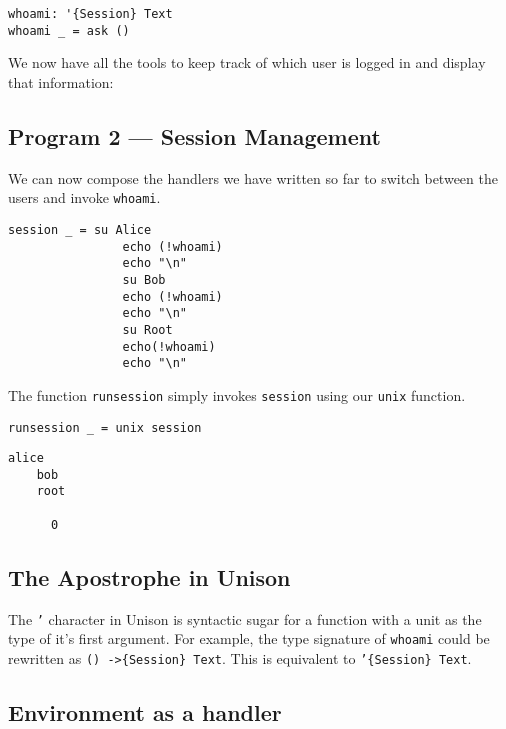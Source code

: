 \documentclass[logo,bsc,singlespacing,parskip]{infthesis}
\begin{document}
\begin{lstlisting}[language=unison]
whoami: '{Session} Text
whoami _ = ask ()
\end{lstlisting}

We now have all the tools to keep track of which user is logged in and display
that information:

\begin{tcolorbox}[colback=gray!10, colframe=black, arc=0pt, outer arc=0pt]
  \section*{Program 2 --- Session Management}
  
  We can now compose the handlers we have written so far to switch between the
  users and invoke \texttt{whoami}.

  \begin{lstlisting}[language=unison]
    session _ = su Alice
                echo (!whoami)
                echo "\n"
                su Bob
                echo (!whoami)
                echo "\n"
                su Root
                echo(!whoami)
                echo "\n"
  \end{lstlisting}

  The function \texttt{runsession} simply invokes \texttt{session} using our
  \texttt{unix} function.

  \begin{lstlisting}[language=unison]
    runsession _ = unix session
  \end{lstlisting}

  \begin{lstlisting}[style=terminal]
    alice
    bob
    root
      
      0
\end{lstlisting}
\end{tcolorbox}

\subsection{The Apostrophe in Unison}

The \texttt{'} character in Unison is syntactic sugar for a function with a
unit as the type of it's first argument. For example, the type signature of 
\texttt{whoami} could be rewritten as \texttt{() ->\{Session\} Text}. This is 
equivalent to \texttt{'\{Session\} Text}.

\subsection{Environment as a handler}
\end{document}
